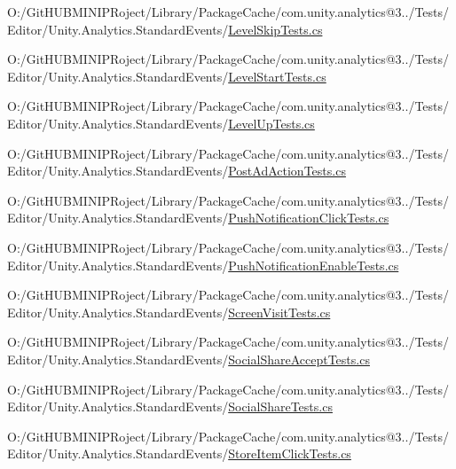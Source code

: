 \begin{DoxyCompactItemize}
O\+:/\+Git\+H\+U\+B\+M\+I\+N\+I\+P\+Roject/\+Library/\+Package\+Cache/com.\+unity.\+analytics@3../\+Tests/\+Editor/\+Unity.\+Analytics.\+Standard\+Events/\mbox{\hyperlink{_level_skip_tests_8cs}{Level\+Skip\+Tests.\+cs}}\item 
O\+:/\+Git\+H\+U\+B\+M\+I\+N\+I\+P\+Roject/\+Library/\+Package\+Cache/com.\+unity.\+analytics@3../\+Tests/\+Editor/\+Unity.\+Analytics.\+Standard\+Events/\mbox{\hyperlink{_level_start_tests_8cs}{Level\+Start\+Tests.\+cs}}\item 
O\+:/\+Git\+H\+U\+B\+M\+I\+N\+I\+P\+Roject/\+Library/\+Package\+Cache/com.\+unity.\+analytics@3../\+Tests/\+Editor/\+Unity.\+Analytics.\+Standard\+Events/\mbox{\hyperlink{_level_up_tests_8cs}{Level\+Up\+Tests.\+cs}}\item 
O\+:/\+Git\+H\+U\+B\+M\+I\+N\+I\+P\+Roject/\+Library/\+Package\+Cache/com.\+unity.\+analytics@3../\+Tests/\+Editor/\+Unity.\+Analytics.\+Standard\+Events/\mbox{\hyperlink{_post_ad_action_tests_8cs}{Post\+Ad\+Action\+Tests.\+cs}}\item 
O\+:/\+Git\+H\+U\+B\+M\+I\+N\+I\+P\+Roject/\+Library/\+Package\+Cache/com.\+unity.\+analytics@3../\+Tests/\+Editor/\+Unity.\+Analytics.\+Standard\+Events/\mbox{\hyperlink{_push_notification_click_tests_8cs}{Push\+Notification\+Click\+Tests.\+cs}}\item 
O\+:/\+Git\+H\+U\+B\+M\+I\+N\+I\+P\+Roject/\+Library/\+Package\+Cache/com.\+unity.\+analytics@3../\+Tests/\+Editor/\+Unity.\+Analytics.\+Standard\+Events/\mbox{\hyperlink{_push_notification_enable_tests_8cs}{Push\+Notification\+Enable\+Tests.\+cs}}\item 
O\+:/\+Git\+H\+U\+B\+M\+I\+N\+I\+P\+Roject/\+Library/\+Package\+Cache/com.\+unity.\+analytics@3../\+Tests/\+Editor/\+Unity.\+Analytics.\+Standard\+Events/\mbox{\hyperlink{_screen_visit_tests_8cs}{Screen\+Visit\+Tests.\+cs}}\item 
O\+:/\+Git\+H\+U\+B\+M\+I\+N\+I\+P\+Roject/\+Library/\+Package\+Cache/com.\+unity.\+analytics@3../\+Tests/\+Editor/\+Unity.\+Analytics.\+Standard\+Events/\mbox{\hyperlink{_social_share_accept_tests_8cs}{Social\+Share\+Accept\+Tests.\+cs}}\item 
O\+:/\+Git\+H\+U\+B\+M\+I\+N\+I\+P\+Roject/\+Library/\+Package\+Cache/com.\+unity.\+analytics@3../\+Tests/\+Editor/\+Unity.\+Analytics.\+Standard\+Events/\mbox{\hyperlink{_social_share_tests_8cs}{Social\+Share\+Tests.\+cs}}\item 
O\+:/\+Git\+H\+U\+B\+M\+I\+N\+I\+P\+Roject/\+Library/\+Package\+Cache/com.\+unity.\+analytics@3../\+Tests/\+Editor/\+Unity.\+Analytics.\+Standard\+Events/\mbox{\hyperlink{_store_item_click_tests_8cs}{Store\+Item\+Click\+Tests.\+cs}}\item 

\end{DoxyCompactItemize}
